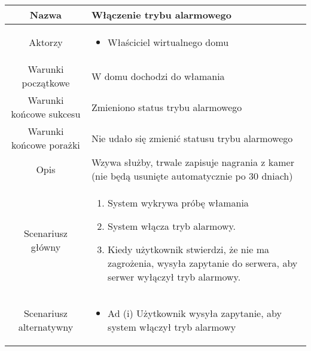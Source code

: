 \documentclass{article}
\begin{document}
\begin{enumerate}
\begin{enumerate}
				\begin{table}[H]
					\centering
					\begin{tabular}{|c|p{7cm}|}
						\hline
						Nazwa                   & Włączenie trybu alarmowego                                                                                                                                                                                                       \\
						\hline
						Aktorzy                 & \begin{itemize}\item Właściciel wirtualnego domu\end{itemize}                                                                                                                                                                    \\
						\hline
						Warunki początkowe      & W domu dochodzi do włamania                                                                                                                                                                                                      \\
						\hline
						Warunki końcowe sukcesu & Zmieniono status trybu alarmowego                                                                                                                                                                                                \\
						\hline
						Warunki końcowe porażki & Nie udało się zmienić statusu trybu alarmowego                                                                                                                                                                                   \\
						\hline
						Opis                    & Wzywa służby, trwale zapisuje nagrania z kamer (nie będą usunięte automatycznie po 30 dniach)                                                                                                                                    \\
						\hline
						Scenariusz główny       & \begin{enumerate}\item System wykrywa próbę włamania

\item System włącza tryb alarmowy.

\item Kiedy użytkownik stwierdzi, że nie ma zagrożenia, wysyła zapytanie do serwera, aby serwer wyłączył tryb alarmowy.\end{enumerate} \\
						\hline
						Scenariusz alternatywny & \begin{itemize}\item Ad (i) Użytkownik wysyła zapytanie, aby system włączył tryb alarmowy


\end{itemize}
\end{tabular}
\end{table}
\end{enumerate}
\end{enumerate}
\end{document}
